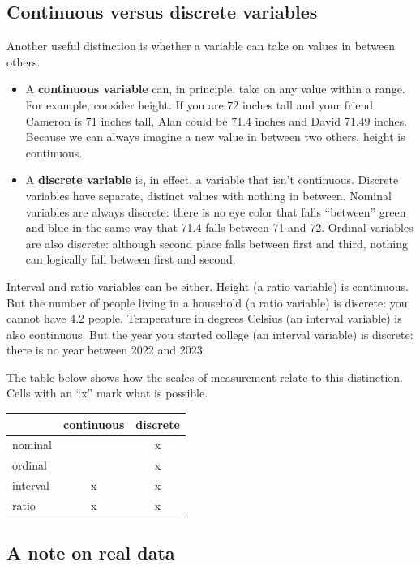 \documentclass[
  letterpaper,
  DIV=11,
  numbers=noendperiod]{scrreprt}
\begin{document}
\subsection{Continuous versus discrete
variables}\label{continuous-versus-discrete-variables}

Another useful distinction is whether a variable can take on values in
between others.

\begin{itemize}
\item
  A \textbf{continuous variable} can, in principle, take on any value
  within a range. For example, consider height. If you are 72 inches
  tall and your friend Cameron is 71 inches tall, Alan could be 71.4
  inches and David 71.49 inches. Because we can always imagine a new
  value in between two others, height is continuous.
\item
  A \textbf{discrete variable} is, in effect, a variable that isn't
  continuous. Discrete variables have separate, distinct values with
  nothing in between. Nominal variables are always discrete: there is no
  eye color that falls ``between'' green and blue in the same way that
  71.4 falls between 71 and 72. Ordinal variables are also discrete:
  although second place falls between first and third, nothing can
  logically fall between first and second.
\end{itemize}

Interval and ratio variables can be either. Height (a ratio variable) is
continuous. But the number of people living in a household (a ratio
variable) is discrete: you cannot have 4.2 people. Temperature in
degrees Celsius (an interval variable) is also continuous. But the year
you started college (an interval variable) is discrete: there is no year
between 2022 and 2023.

The table below shows how the scales of measurement relate to this
distinction. Cells with an ``x'' mark what is possible.

\begin{longtable}[]{@{}lcc@{}}
\toprule\noalign{}
& continuous & discrete \\
\midrule\noalign{}
\endhead
\bottomrule\noalign{}
\endlastfoot
nominal & & x \\
ordinal & & x \\
interval & x & x \\
ratio & x & x \\
\end{longtable}

\subsection{A note on real data}\label{a-note-on-real-data}
\end{document}

